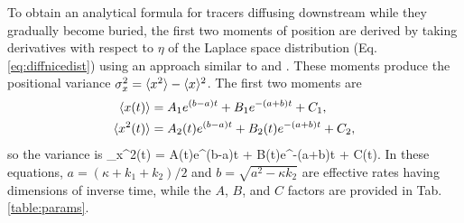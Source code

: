 To obtain an analytical formula for tracers diffusing downstream while they gradually become buried, the first two moments of position are derived by taking derivatives with respect to $\eta$ of the Laplace space distribution (Eq. \ref{eq:diffnicedist}) using an approach similar to \citet{Shlesinger1974} and \citet{Weeks1998}. These moments produce the positional variance $\sigma_x^2 = \langle x^2\rangle - \langle x \rangle^2$. 
The first two moments are
\begin{align}
	\langle x(t) \rangle &= A_1 e^{(b-a)t}+B_1e^{-(a+b)t}+C_1, \label{eq:mean}\\
	\langle x^2(t) \rangle &= A_2(t)e^{(b-a)t}+B_2(t)e^{-(a+b)t}+C_2, \label{eq:second}
\end{align}
so the variance is 
\be \sigma_x^2(t) = A(t)e^{(b-a)t} + B(t)e^{-(a+b)t} + C(t). \label{eq:var}\ee
In these equations, $a = (\kappa + k_1+k_2)/2$ and $b = \sqrt{a^2-\kappa k_2}$ are effective rates having dimensions of inverse time, while the $A$, $B$, and $C$ factors are provided in Tab. \ref{table:params}.


